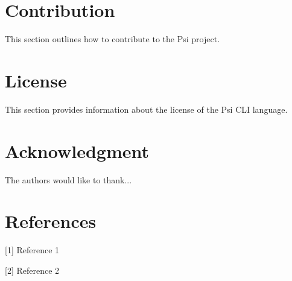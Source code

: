 \documentclass[conference]{IEEEtran}
\begin{document}
\section{Contribution}
This section outlines how to contribute to the Psi project.

\section{License}
This section provides information about the license of the Psi CLI language.

\section*{Acknowledgment}
The authors would like to thank...

\section*{References}
 [1] Reference 1

    [2] Reference 2
\end{document}

